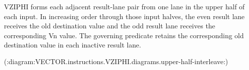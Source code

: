 VZIPHI forms each adjacent result-lane pair from one lane in the upper half of
each input.  In increasing order through those input halves, the even result
lane receives the old destination value and the odd result lane receives the
corresponding Vn value.  The governing predicate retains the corresponding old
destination value in each inactive result lane.

(:diagram:VECTOR.instructions.VZIPHI.diagrams.upper-half-interleave:)

